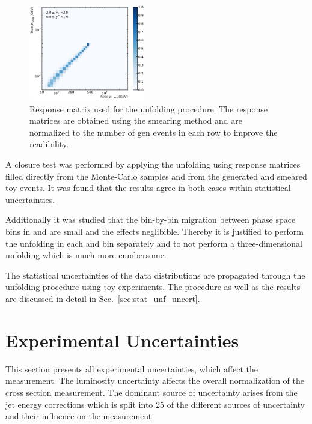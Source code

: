 \begin{figure}[htp]
    \includegraphics[width=0.45\textwidth]{figures/measurement/res_matrix_ptavg_normalized_yb2ys0.pdf}
    \caption{Response matrix used for the unfolding procedure. The response matrices are obtained
            using the smearing method and are normalized to the number of gen events in each row to improve
            the readibility.}
    \label{fig:res_matrix}
\end{figure}

A closure test was performed by applying the unfolding using response matrices
filled directly from the Monte-Carlo samples and from the generated and smeared
toy events. It was found that the results agree in both cases within statistical
uncertainties.

Additionally it was studied that the bin-by-bin migration between phase space
bins in \ystar and \yboost are small and the effects neglibible. Thereby it is
justified to perform the unfolding in each \ystar and \yboost bin separately and
to not perform a three-dimensional unfolding which is much more cumbersome.

The statistical uncertainties of the data distributions are propagated through
the unfolding procedure using toy experiments. The procedure as well as the
results are discussed in detail in Sec.~\ref{sec:stat_unf_uncert}.


\section{Experimental Uncertainties}
\label{experimental_uncertainties}

This section presents all experimental uncertainties, which affect the
measurement.  The luminosity uncertainty affects the
overall normalization of the cross section measurement. The dominant source of
uncertainty arises from the jet energy corrections which is split into 25
of the different sources of uncertainty and their influence on the measurement

